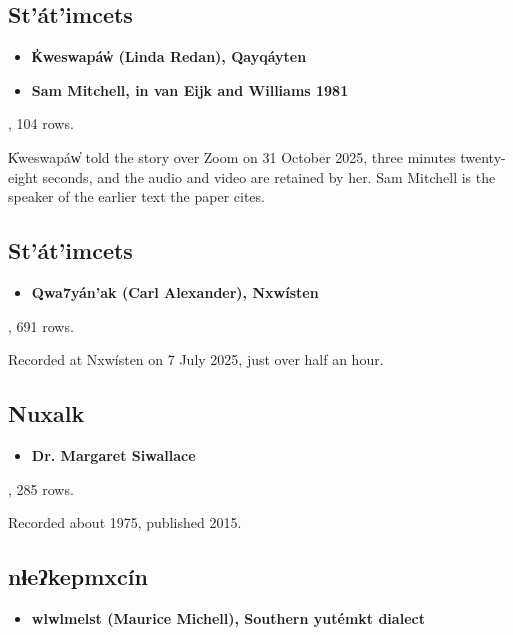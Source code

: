\subsection{St'át'imcets}

\begin{itemize}
\item \textbf{K̓weswapáw̓ (Linda Redan), Qayqáyten}
\item \textbf{Sam Mitchell, in van Eijk and Williams 1981}
\end{itemize}

\cite{src:Matthewson-and-Redan-2026}, 104 rows.

K̓weswapáw̓ told the story over Zoom on 31 October 2025, three minutes twenty-eight seconds, and the audio and video are retained by her. Sam Mitchell is the speaker of the earlier text the paper cites.

\subsection{St'át'imcets}

\begin{itemize}
\item \textbf{Qwa7yán'ak (Carl Alexander), Nxwísten}
\end{itemize}

\cite{src:Alexander-and-Davis-2026}, 691 rows.

Recorded at Nxwísten on 7 July 2025, just over half an hour.

\subsection{Nuxalk}

\begin{itemize}
\item \textbf{Dr. Margaret Siwallace}
\end{itemize}

\cite{src:Nater-2015}, 285 rows.

Recorded about 1975, published 2015.

\subsection{nɬeʔkepmxcín}

\begin{itemize}
\item \textbf{wlwlmelst (Maurice Michell), Southern yutémkt dialect}
\end{itemize}


